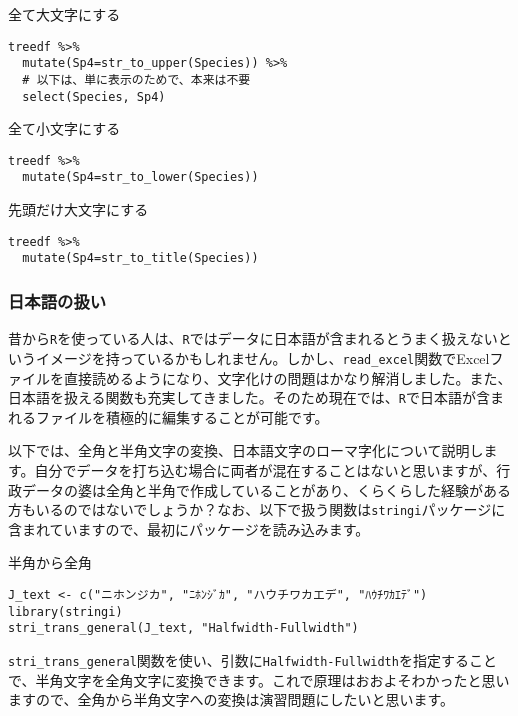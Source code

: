 \begin{itembox}[l]{全て大文字にする}
\begin{verbatim}
treedf %>%
  mutate(Sp4=str_to_upper(Species)) %>%
  # 以下は、単に表示のためで、本来は不要
  select(Species, Sp4)
\end{verbatim}
\end{itembox}

\begin{itembox}[l]{全て小文字にする}
\begin{verbatim}
treedf %>%
  mutate(Sp4=str_to_lower(Species))
\end{verbatim}
\end{itembox}

\begin{itembox}[l]{先頭だけ大文字にする}
\begin{verbatim}
treedf %>%
  mutate(Sp4=str_to_title(Species))
\end{verbatim}
\end{itembox}
    \subsubsection{日本語の扱い}
昔から\texttt{R}を使っている人は、\texttt{R}ではデータに日本語が含まれるとうまく扱えないというイメージを持っているかもしれません。しかし、\verb|read_excel|関数でExcelファイルを直接読めるようになり、文字化けの問題はかなり解消しました。また、日本語を扱える関数も充実してきました。そのため現在では、\texttt{R}で日本語が含まれるファイルを積極的に編集することが可能です。

以下では、全角と半角文字の変換、日本語文字のローマ字化について説明します。自分でデータを打ち込む場合に両者が混在することはないと思いますが、行政データの婆は全角と半角で作成していることがあり、くらくらした経験がある方もいるのではないでしょうか？なお、以下で扱う関数は\verb|stringi|パッケージに含まれていますので、最初にパッケージを読み込みます。

\begin{itembox}[l]{半角から全角}
\begin{verbatim}
J_text <- c("ニホンジカ", "ﾆﾎﾝｼﾞｶ", "ハウチワカエデ", "ﾊｳﾁﾜｶｴﾃﾞ")
library(stringi)
stri_trans_general(J_text, "Halfwidth-Fullwidth")
\end{verbatim}
\end{itembox}
\verb|stri_trans_general|関数を使い、引数に\verb|Halfwidth-Fullwidth|を指定することで、半角文字を全角文字に変換できます。これで原理はおおよそわかったと思いますので、全角から半角文字への変換は演習問題にしたいと思います。

